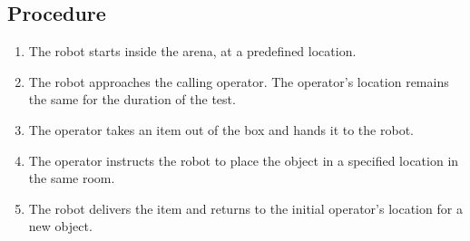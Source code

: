 \subsection*{Procedure}
\begin{enumerate}[nosep]
	\item The robot starts inside the arena, at a predefined location.
	\item The robot approaches the calling operator. The operator's location remains the same for the duration of the test.
	\item The operator takes an item out of the box and hands it to the robot. 
	\item The operator instructs the robot to place the object in a specified location in the same room.
	\item The robot delivers the item and returns to the initial operator's location for a new object.
\end{enumerate}

